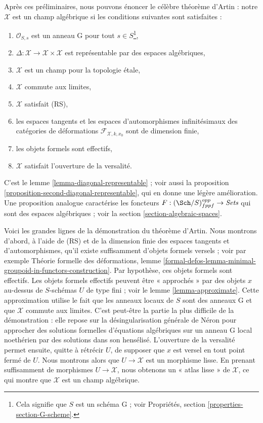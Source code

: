 \medskip\noindent
Après ces préliminaires, nous pouvons énoncer le célèbre théorème d'Artin :
notre $\mathcal{X}$ est un champ algébrique si les conditions suivantes sont
satisfaites :
\begin{enumerate}
\item $\mathcal{O}_{S, s}$ est un anneau G pour tout $s \in S$\footnote{Cela
signifie que $S$ est un schéma G ; voir
Propriétés, section \ref{properties-section-G-scheme}.},
\item $\Delta : \mathcal{X} \to \mathcal{X} \times \mathcal{X}$
est représentable par des espaces algébriques,
\item $\mathcal{X}$ est un champ pour la topologie étale,
\item $\mathcal{X}$ commute aux limites,
\item $\mathcal{X}$ satisfait (RS),
\item les espaces tangents et les espaces d'automorphismes infinitésimaux
des catégories de déformations $\mathcal{F}_{\mathcal{X}, k, x_0}$
sont de dimension finie,
\item les objets formels sont effectifs,
\item $\mathcal{X}$ satisfait l'ouverture de la versalité.
\end{enumerate}
C'est le lemme \ref{lemma-diagonal-representable} ; voir aussi la
proposition \ref{proposition-second-diagonal-representable}, qui en donne une
légère amélioration. Une proposition analogue caractérise les foncteurs
$F : (\Sch/S)_{fppf}^{opp} \to \textit{Sets}$ qui sont des espaces
algébriques ; voir la section \ref{section-algebraic-spaces}.

\medskip\noindent
Voici les grandes lignes de la démonstration du théorème d'Artin. Nous montrons
d'abord, à l'aide de (RS) et de la dimension finie des espaces tangents et
d'automorphismes, qu'il existe suffisamment d'objets formels versels ; voir par
exemple Théorie formelle des déformations, lemme
\ref{formal-defos-lemma-minimal-groupoid-in-functors-construction}. Par
hypothèse, ces objets formels sont effectifs. Les objets formels effectifs
peuvent être « approchés » par des objets $x$ au-dessus de $S$-schémas $U$ de
type fini ; voir le lemme \ref{lemma-approximate}. Cette approximation utilise
le fait que les anneaux locaux de $S$ sont des anneaux G et que $\mathcal{X}$
commute aux limites. C'est peut-être la partie la plus difficile de la
démonstration : elle repose sur la désingularisation générale de Néron pour
approcher des solutions formelles d'équations algébriques sur un anneau G
local noethérien par des solutions dans son hensélisé. L'ouverture de la
versalité permet ensuite, quitte à rétrécir $U$, de supposer que $x$ est versel
en tout point fermé de $U$. Nous montrons alors que $U \to \mathcal{X}$ est un
morphisme lisse. En prenant suffisamment de morphismes
$U \to \mathcal{X}$, nous obtenons un « atlas lisse » de $\mathcal{X}$, ce qui
montre que $\mathcal{X}$ est un champ algébrique.

